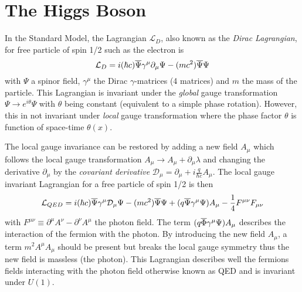 \section{The Higgs Boson}
\label{sec:HiggsTheo}

In the Standard Model, the Lagrangian $\mathcal{L}_{D}$, also known as the \textit{Dirac Lagrangian}, for free particle of spin 1/2 such as the electron is \cite{Griffiths:343277}
\begin{equation}
  \mathcal{L}_{D} = i(\hbar c)\overline{\rm \Psi}\gamma^{\mu}\partial_{\mu}\Psi - (mc^2)\overline{\rm \Psi}\Psi
\end{equation}
with $\Psi$ a spinor field, $\gamma^{\mu}$ the Dirac $\gamma$-matrices (4 matrices) \cite{Peskin:1995ev} and $m$ the mass of the particle. This Lagrangian is invariant under the \textit{global} gauge transformation $\Psi \rightarrow e^{i\theta}\Psi$ with $\theta$ being constant (equivalent to a simple phase rotation). However, this in not invariant under \textit{local} gauge transformation where the phase factor $\theta$ is function of space-time $\theta(x)$.

The local gauge invariance can be restored by adding a new field $A_{\mu}$ which follows the local gauge transformation $A_{\mu} \rightarrow A_{\mu} + \partial_{\mu}\lambda$ and changing the derivative $\partial_{\mu}$ by the \textit{covariant derivative} $\mathcal{D}_{\mu} = \partial_{\mu} + i\frac{q}{\hbar c}A_{\mu}$. The local gauge invariant Lagrangian for a free particle of spin 1/2 is then \cite{Griffiths:343277}
\begin{equation}
  \mathcal{L}_{QED} = i(\hbar c)\overline{\rm \Psi}\gamma^{\mu}\mathcal{D}_{\mu}\Psi - (mc^2)\overline{\rm \Psi}\Psi + (q\overline{\rm \Psi}\gamma^{\mu}\Psi)A_{\mu} - \frac{1}{4}F^{\mu\nu}F_{\mu\nu}
\end{equation}
with $F^{\mu\nu} \equiv \partial^{\mu}A^{\nu} - \partial^{\nu}A^{\mu}$ the photon field. The term $(q\overline{\rm \Phi}\gamma^{\mu}\Psi)A_{\mu}$ describes the interaction of the fermion with the photon. By introducing the new field $A_{\mu}$, a term $m^2A^{\mu}A_{\mu}$ should be present but breaks the local gauge symmetry thus the new field is massless (the photon). This Lagrangian describes well the fermions fields interacting with the photon field otherwise known as QED and is invariant under $U(1)$.

